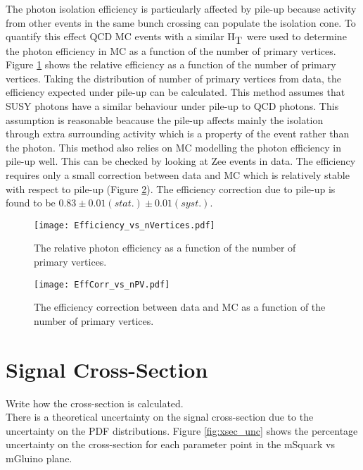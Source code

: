 The photon isolation efficiency is particularly affected by pile-up because
activity from other events in the same bunch crossing can populate the isolation
cone. To quantify this effect QCD MC events with a similar $\mbox{H}_{\mbox{T}}$ were used to
determine the photon efficiency in MC as a function of the number of primary
vertices. Figure \ref{fig:Efficiency_vs_nVertices} shows the relative efficiency
as a function of the number of primary vertices. Taking the distribution of 
number of primary vertices from data, the efficiency expected under pile-up can 
be calculated. This method assumes that SUSY photons have a similar behaviour 
under pile-up to QCD photons. This assumption is reasonable beacause the pile-up 
affects mainly the isolation through extra surrounding activity which is a 
property of the event rather than the photon. This method also relies on MC 
modelling the photon efficiency in pile-up well. This can be checked by looking 
at Zee events in data. The efficiency requires only a small correction between 
data and MC which is relatively stable with respect to pile-up (Figure 
\ref{fig:EffCorr_vs_nPV}). The efficiency correction due to pile-up is found to 
be $0.83\pm0.01(stat.)\pm0.01(syst.)$. \\

\begin{figure}
\begin{center}
\texttt{[image: Efficiency\_vs\_nVertices.pdf]}
\end{center}
\caption{The relative photon efficiency as a function of the number of primary 
vertices.}
\label{fig:Efficiency_vs_nVertices}
\end{figure}

\begin{figure}
\begin{center}
\texttt{[image: EffCorr\_vs\_nPV.pdf]}
\end{center}
\caption{The efficiency correction between data and MC as a function of the
number of primary vertices.}
\label{fig:EffCorr_vs_nPV}
\end{figure}

\section{Signal Cross-Section}

Write how the cross-section is calculated. \\

There is a theoretical uncertainty on the signal cross-section due to the
uncertainty on the PDF distributions. Figure \ref{fig:xsec_unc} shows the
percentage uncertainty on the cross-section for each parameter point in the
mSquark vs mGluino plane.

